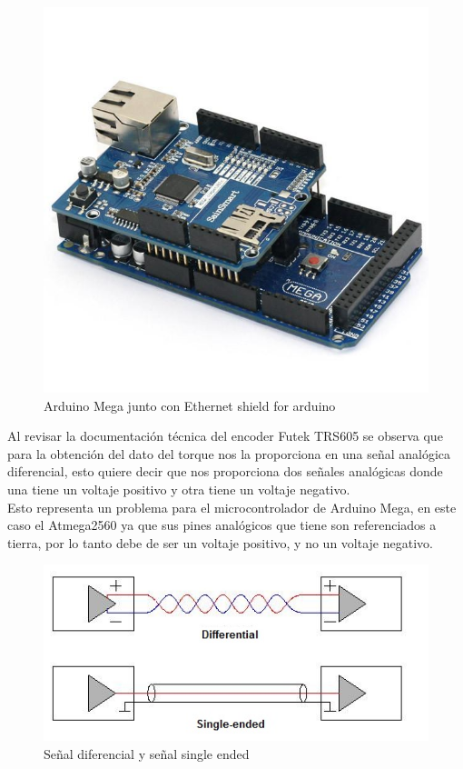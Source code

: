 \documentclass[12pt,titlepage]{article}
\begin{document}
 \begin{figure}[htbp]
\hspace*{3.8cm} 
\includegraphics[scale=2.13]{arduino_mega_ethernet}
\caption{Arduino Mega junto con Ethernet shield for arduino}
\end{figure}

\newpage

Al revisar la documentación técnica del encoder Futek TRS605 se observa que para la obtención del dato del torque nos la proporciona en una señal analógica diferencial, esto quiere decir que nos proporciona dos señales analógicas donde una tiene un voltaje positivo y otra tiene un voltaje negativo. \\ 

Esto representa un problema para el microcontrolador de Arduino Mega, en este caso el Atmega2560 ya que sus pines analógicos que tiene son referenciados a tierra, por lo tanto debe de ser un voltaje positivo, y no un voltaje negativo.\\

\begin{figure}[htbp]
\hspace*{3.8cm} 
\includegraphics[scale=0.68]{signals_}
\caption{Señal diferencial y señal single ended}
\end{figure}
\end{document}
